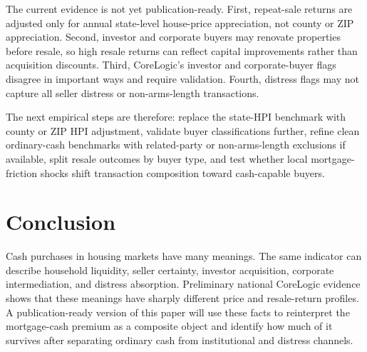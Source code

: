 \documentclass[12pt, letterpaper]{article}
\begin{document}
The current evidence is not yet publication-ready. First, repeat-sale returns are adjusted only for annual state-level house-price appreciation, not county or ZIP appreciation. Second, investor and corporate buyers may renovate properties before resale, so high resale returns can reflect capital improvements rather than acquisition discounts. Third, CoreLogic's investor and corporate-buyer flags disagree in important ways and require validation. Fourth, distress flags may not capture all seller distress or non-arms-length transactions.

The next empirical steps are therefore: replace the state-HPI benchmark with county or ZIP HPI adjustment, validate buyer classifications further, refine clean ordinary-cash benchmarks with related-party or non-arms-length exclusions if available, split resale outcomes by buyer type, and test whether local mortgage-friction shocks shift transaction composition toward cash-capable buyers.

\section{Conclusion}\label{sec:conclusion}

Cash purchases in housing markets have many meanings. The same indicator can describe household liquidity, seller certainty, investor acquisition, corporate intermediation, and distress absorption. Preliminary national CoreLogic evidence shows that these meanings have sharply different price and resale-return profiles. A publication-ready version of this paper will use these facts to reinterpret the mortgage-cash premium as a composite object and identify how much of it survives after separating ordinary cash from institutional and distress channels.




\end{document}
